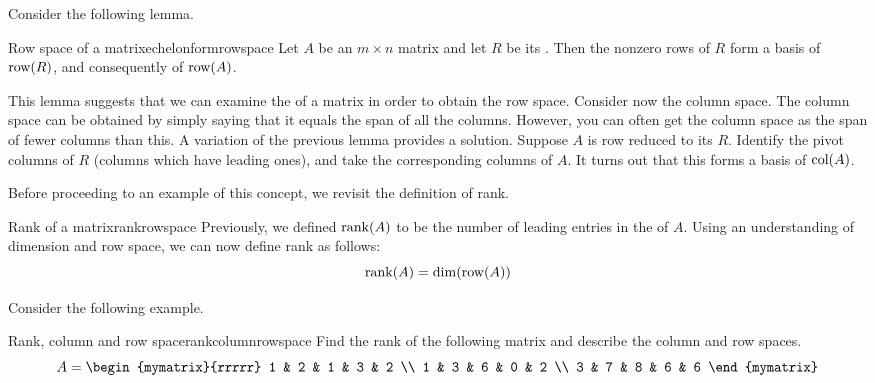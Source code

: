 Consider the following lemma. 

\begin{lemma}{Row space of a {\ef} matrix}{echelonformrowspace}
Let $A$ be an $m \times n$ matrix and let $R$ be its {\ef}. Then the nonzero rows of $R$ form a basis of $\mbox{row}(R)$, and consequently of $\mbox{row}(A)$. 
\end{lemma}

This lemma suggests that we can examine the {\ef} of a matrix in order to obtain the row space. Consider now the column space. The column space can be obtained by simply saying that
it equals the span of all the columns. However, you can often get the column
space as the span of fewer columns than this. A variation of the previous lemma provides a solution. Suppose $A$ is row reduced to its {\ef} $R$. Identify the pivot columns of $R$ (columns which have leading ones), and take the corresponding columns of $A$. It turns out that this forms a basis of $\mbox{col}(A)$. 

Before proceeding to an example of this concept, we revisit the definition of rank. 

\begin{definition}{Rank of a matrix}{rankrowspace}
Previously, we defined $\mbox{rank}(A)$ to be the number of leading entries in the {\ef} of $A$. Using an understanding of dimension and row space, we can now define rank as follows:
\[
\mbox{rank}(A) = \dim(\mbox{row}(A))
\]
\end{definition}

Consider the following example. 

\begin{example}{Rank, column and row space}{rankcolumnrowspace}
Find the rank of the following matrix and describe the column and row spaces.
\begin{equation*}
A = 
\begin{mymatrix}{rrrrr}
1 & 2 & 1 & 3 & 2 \\
1 & 3 & 6 & 0 & 2 \\
3 & 7 & 8 & 6 & 6
\end{mymatrix}  
\end{equation*}
\end{example}

